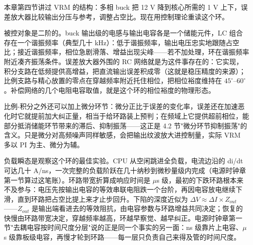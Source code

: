 
本章第四节讲过 VRM 的结构：多相 buck 把 12 V 降到核心所需的 1 V 上下，误差放大器比较输出分压与参考，调整占空比。现在用控制理论重读这个环。

被控对象是二阶的。buck 输出级的电感与输出电容各是一个储能元件，LC 组合存在一个谐振频率（典型几十 kHz）：低于谐振频率，输出电压忠实地跟随占空比；接近谐振频率，相位急剧滑落、增益出现尖峰——若不加处理，环在谐振频率附近凑齐振荡条件。误差放大器外围的 RC 网络就是为这件事存在的：它实现，积分支路在低频提供高增益，把直流输出误差积成零（这就是稳压精度的来源）；比例支路与精心放置的零点在穿越频率附近托住相位，把相位裕度维持在 $45^{\circ}$--$60^{\circ}$。补偿网络的几个电阻电容取值，就是这个环的相位裕度的物理形态。

比例-积分之外还可以加上微分环节：微分正比于误差的变化率，误差还在加速恶化时它就提前加大纠正量，相当于给环路装上预判；在频域上它提供超前相位，能部分抵消储能环节带来的滞后、抑制振荡——这正是 4.2 节"微分环节抑制振荡"的含义。只是微分对高频噪声同样敏感，会把输出纹波放大进控制量，实际 VRM 多以 PI 为主、微分为辅。

负载瞬态是观察这个环的最佳实验。CPU 从空闲跳进全负载，电流边沿的 di/dt 可达几十 A/ns，一次完整的负载阶跃在几十纳秒到微秒量级内完成（电源时钟章第一节算过这笔账）。环路带宽折算成响应时间是 $\mu$s 级，最初的下跌环路根本来不及参与：电压先按输出电容的等效串联电阻跌一个台阶，再因电容放电继续下滑，直到环路把占空比提上来才止步回升。下陷的深度近似为 $\Delta V \approx \Delta I \times Z_{out}$——$Z_{out}$ 是输出端看进去的等效阻抗，由电容参数与环路增益共同决定；恢复的快慢由环路带宽决定，穿越频率越高，环越早察觉、越早纠正。电源时钟章第一节"去耦电容按时间尺度分层"说的正是同一个事实的另一面：ns 级靠片上电容、$\mu$s 级靠板级电容，再慢才轮到环路——每一层只负责自己来得及管的时间尺度。

